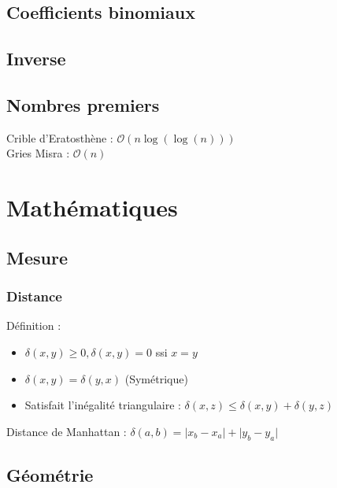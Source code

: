 \documentclass[8pt]{article}
\begin{document}
        \subsection{Coefficients binomiaux}
        {\scriptsize}
        \subsection{Inverse}
        {\scriptsize}
        \subsection{Nombres premiers}
        Crible d'Eratosthène : $\mathcal{O}(n \log(\log(n)))$ \\
        Gries Misra : $\mathcal{O}(n)$
        {\scriptsize}
    \section{Mathématiques}
        \subsection{Mesure}
            \subsubsection{Distance}
            Définition : 
            \begin{itemize}
                \item $\delta(x,y) \geq 0, \delta(x,y) = 0$ ssi $x=y$
                \item $\delta(x,y) = \delta(y,x)$ (Symétrique)
                \item Satisfait l'inégalité triangulaire : $\delta(x,z) \leq \delta(x,y) + \delta(y,z)$
            \end{itemize}
            Distance de Manhattan :
            $\delta(a,b) = \lvert x_b-x_a \rvert + \lvert y_b-y_a \rvert$
        \subsection{Géométrie}
\end{document}
